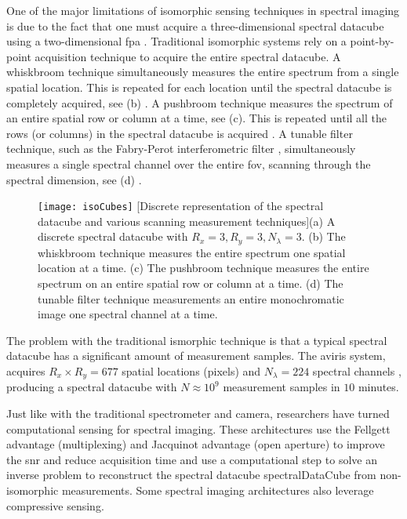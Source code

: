 One of the major limitations of \gls{isomorphic} sensing techniques in spectral imaging is due to the fact that one must acquire a three-dimensional spectral datacube using a two-dimensional \acrfull{fpa} \cite{garini2006spectral}. Traditional isomorphic systems rely on a point-by-point acquisition technique to acquire the entire spectral datacube. A \gls{whiskbroom} technique simultaneously measures the entire spectrum from a single spatial location. This is repeated for each location until the spectral datacube is completely acquired, see (b) \cite{wolfe1997introduction}. A \gls{pushbroom} technique measures the spectrum of an entire spatial row or column at a time, see (c). This is repeated until all the rows (or columns) in the spectral datacube is acquired \cite{yang2003ccd, wolfe1997introduction}. A \gls{tunable filter} technique, such as the Fabry-Perot interferometric filter \cite{fabry1897franges, perot1899application, fabry1901new}, simultaneously measures a single spectral channel  over the entire \gls{fov}, scanning through the spectral dimension, see (d) \cite{gat2000imaging}. 
%
%
\begin{figure}[htb]
	\texttt{[image: isoCubes]}
	[Discrete representation of the spectral datacube and various scanning measurement techniques]{(a) A discrete spectral datacube with $R_x = 3, R_y = 3, N_{\lambda} = 3$. (b) The whiskbroom technique measures the entire spectrum one spatial location at a time. (c) The pushbroom technique measures the entire spectrum on an entire spatial row or column at a time. (d) The tunable filter technique measurements an entire monochromatic image one spectral channel at a time.}
	\label{fig:isoCubes}
\end{figure}
%
%
The problem with the traditional ismorphic technique is that a typical spectral datacube has a significant amount of measurement samples. The \acrfull{aviris} system, acquires $R_x \times R_y = 677$ spatial locations (pixels) and $N_{\lambda} = 224$ spectral channels \cite{green1998imaging}, producing a spectral datacube with $N \approx 10^9$ measurement samples in $10$ minutes. 

Just like with the traditional spectrometer and camera, researchers have turned \gls{computational sensing} for spectral imaging. These architectures use the \gls{Fellgett advantage} (multiplexing) and \gls{Jacquinot advantage} (open aperture) to improve the \acrfull{snr} and reduce acquisition time and use a computational step to solve an inverse problem to reconstruct the spectral datacube \gls{spectralDataCube} from non-isomorphic measurements. Some spectral imaging architectures also leverage \gls{compressive sensing}. 

